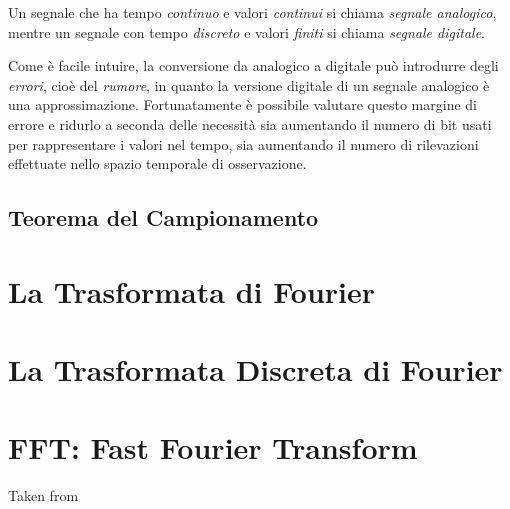Un segnale che ha tempo \emph{continuo} e valori \emph{continui} si chiama
\emph{segnale analogico}, mentre un segnale con tempo \emph{discreto} e valori
\emph{finiti} si chiama \emph{segnale digitale}.

Come \`e facile intuire, la conversione da analogico a digitale pu\`o introdurre
degli \emph{errori}, cio\`e del \emph{rumore}, in quanto la versione digitale di
un segnale analogico \`e una approssimazione. Fortunatamente \`e possibile
valutare questo margine di errore e ridurlo a seconda delle necessit\`a sia
aumentando il numero di bit usati per rappresentare i valori nel tempo, sia
aumentando il numero di rilevazioni effettuate nello spazio temporale di
osservazione.
\subsection{Teorema del Campionamento}
\section{La Trasformata di Fourier}
\section{La Trasformata Discreta di Fourier}
\section{FFT: Fast Fourier Transform}
Taken from \cite{bertoni}
